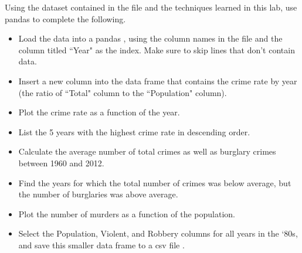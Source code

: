 \begin{problem}
Using the dataset contained in the file  and the techniques learned in this lab, 
use pandas to complete the following.
\begin{itemize}
\item Load the data into a pandas , using the column names in the file and the column titled
``Year" as the index. Make sure to skip lines that don't contain data.

\item Insert a new column into the data frame that contains the crime rate by year (the ratio of ``Total" column
to the ``Population" column).

\item Plot the crime rate as a function of the year.

\item List the 5 years with the highest crime rate in descending order.

\item Calculate the average number of total crimes as well as burglary crimes between 1960 and 2012.

\item Find the years for which the total number of crimes was below average, but the number of burglaries
was above average.

\item Plot the number of murders as a function of the population.

\item Select the Population, Violent, and Robbery columns for all years in the `80s, and save
this smaller data frame to a csv file .
\end{itemize}
\end{problem}